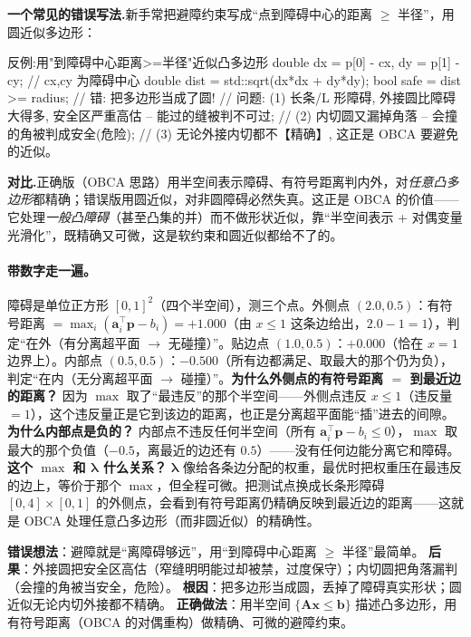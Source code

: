 \noindent{}\textbf{一个常见的错误写法.}\;新手常把避障约束写成“点到障碍中心的距离 $\ge$ 半径”，用圆近似多边形：

\begin{codebox}[C++]{反例:用"到障碍中心距离>=半径"近似凸多边形}
double dx = p[0] - cx, dy = p[1] - cy;           // cx,cy 为障碍中心
double dist = std::sqrt(dx*dx + dy*dy);
bool safe = dist >= radius;                       // 错: 把多边形当成了圆!
// 问题: (1) 长条/L 形障碍, 外接圆比障碍大得多, 安全区严重高估 -- 能过的缝被判不可过;
//       (2) 内切圆又漏掉角落 -- 会撞的角被判成安全(危险);
//       (3) 无论外接内切都不【精确】, 这正是 OBCA 要避免的近似。
\end{codebox}

\noindent\textbf{对比.}\;正确版（OBCA 思路）用半空间表示障碍、有符号距离判内外，对\emph{任意凸多边形}都精确；错误版用圆近似，对非圆障碍必然失真。这正是 OBCA 的价值——它处理\emph{一般凸障碍}（甚至凸集的并）而不做形状近似，靠“半空间表示 + 对偶变量光滑化”，既精确又可微，这是软约束和圆近似都给不了的。

\paragraph{带数字走一遍。}
障碍是单位正方形 $[0,1]^2$（四个半空间），测三个点。外侧点 $(2.0,0.5)$：有符号距离 $=\max_i(\mathbf a_i^\top\mathbf p-b_i)=+1.000$（由 $x\le 1$ 这条边给出，$2.0-1=1$），判定“在外（有分离超平面 $\to$ 无碰撞）”。贴边点 $(1.0,0.5)$：$+0.000$（恰在 $x=1$ 边界上）。内部点 $(0.5,0.5)$：$-0.500$（所有边都满足、取最大的那个仍为负），判定“在内（无分离超平面 $\to$ 碰撞）”。\textbf{为什么外侧点的有符号距离 $=$ 到最近边的距离？} 因为 $\max$ 取了“最违反”的那个半空间——外侧点违反 $x\le 1$（违反量 $=1$），这个违反量正是它到该边的距离，也正是分离超平面能“插”进去的间隙。\textbf{为什么内部点是负的？} 内部点不违反任何半空间（所有 $\mathbf a_i^\top\mathbf p-b_i\le 0$），$\max$ 取最大的那个负值（$-0.5$，离最近的边还有 $0.5$）——没有任何边能分离它和障碍。\textbf{这个 $\max$ 和 $\boldsymbol\lambda$ 什么关系？} $\boldsymbol\lambda$ 像给各条边分配的权重，最优时把权重压在最违反的边上，等价于那个 $\max$，但全程可微。把测试点换成长条形障碍 $[0,4]\times[0,1]$ 的外侧点，会看到有符号距离仍精确反映到最近边的距离——这就是 OBCA 处理任意凸多边形（而非圆近似）的精确性。

\begin{pitfall}
\textbf{错误想法}：避障就是“离障碍够远”，用“到障碍中心距离 $\ge$ 半径”最简单。\;
\textbf{后果}：外接圆把安全区高估（窄缝明明能过却被禁，过度保守）；内切圆把角落漏判（会撞的角被当安全，危险）。\;
\textbf{根因}：把多边形当成圆，丢掉了障碍真实形状；圆近似无论内切外接都不精确。\;
\textbf{正确做法}：用半空间 $\{\mathbf A\mathbf x\le\mathbf b\}$ 描述凸多边形，用有符号距离（OBCA 的对偶重构）做精确、可微的避障约束。
\end{pitfall}


